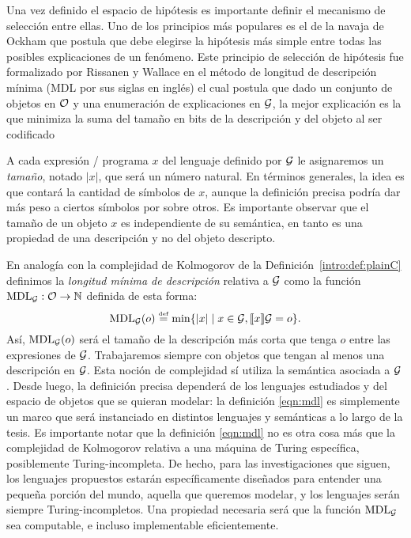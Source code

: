 Una vez definido el espacio de hipótesis es importante definir el mecanismo de selección entre ellas. Uno de los principios más populares es el de la navaja de Ockham que postula que debe elegirse la hipótesis más simple entre todas las posibles explicaciones de un fenómeno. Este principio de selección de hipótesis fue formalizado por Rissanen y Wallace \cite{} en el método de longitud de descripción mínima (MDL por sus siglas en inglés) el cual postula que dado un conjunto de objetos en $\+O$ y una enumeración de explicaciones en $\gram$, la mejor explicación es la que minimiza la suma del tamaño en bits de la descripción y del objeto al ser codificado 


A cada expresión / programa $x$ del lenguaje definido por $\gram$ le asignaremos un {\em tamaño}, notado $|x|$, que será un número natural. En términos generales, la idea es que contará la cantidad de símbolos de $x$, aunque la definición precisa podría dar más peso a ciertos símbolos por sobre otros. Es importante observar que el tamaño de un objeto $x$ es independiente de su semántica, en tanto es una propiedad de una descripción y no del objeto descripto.

En analogía con la complejidad de Kolmogorov de la Definición~\ref{intro:def:plainC} definimos la {\em longitud mínima de descripción} relativa a $\gram$ como la función $\mdl{\gram}:\+O\to\nat$ definida de esta forma:
%
\begin{equation}\label{eqn:mdl}
\mdl{\gram}(o)\eqdef\min\{|x|\mid x\in\gram,\sem{x}{\gram}=o\}.
\end{equation}
%
Así, $\mdl{\gram}(o)$ será el tamaño de la descripción más corta que tenga $o$ entre las expresiones de $\gram$. Trabajaremos siempre con objetos que tengan al menos una descripción en $\gram$. Esta noción de complejidad sí utiliza la semántica asociada a $\gram$. Desde luego, la definición precisa dependerá de los lenguajes estudiados y del espacio de objetos que se quieran modelar: la definición \eqref{eqn:mdl} es simplemente un marco que será instanciado en distintos lenguajes y semánticas a lo largo de la tesis. Es importante notar que la definición \eqref{eqn:mdl} no es otra cosa más que la complejidad de Kolmogorov relativa a una máquina de Turing específica, posiblemente Turing-incompleta. De hecho, para las investigaciones que siguen, los lenguajes propuestos estarán específicamente diseñados para entender una pequeña porción del mundo, aquella que queremos modelar, y los lenguajes serán siempre Turing-incompletos. Una propiedad necesaria será que la función $\mdl{\gram}$ sea computable, e incluso implementable eficientemente.





